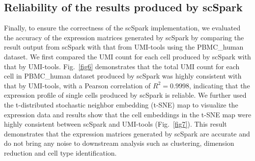 \documentclass[conference]{IEEEtran}
\begin{document}



\subsection{Reliability of the results produced by scSpark} 
Finally, to ensure the correctness of the scSpark implementation, we evaluated the accuracy of the expression matrices generated by scSpark by comparing the result output from scSpark with that from UMI-tools using the PBMC\_human dataset. 
We first compared the UMI count for each cell produced by scSpark with that by UMI-tools. 
Fig.~\ref{fig6} demonstrates that the total UMI count for each cell in PBMC\_human dataset produced by scSpark was highly consistent with that by UMI-tools, with a Pearson correlation of $R^{2} = 0.9998$, indicating that the expression profile of single cells produced by scSpark is reliable.
We further used the t-distributed stochastic neighbor embedding (t-SNE) map to visualize the expression data and results show that the cell embeddings in the t-SNE map were highly consistent between scSpark and UMI-tools (Fig.~\ref{fig7}).
This result demonstrates that the expression matrices generated by scSpark are accurate and do not bring any noise to downstream analysis such as clustering, dimension reduction and cell type identification. 
\end{document}
